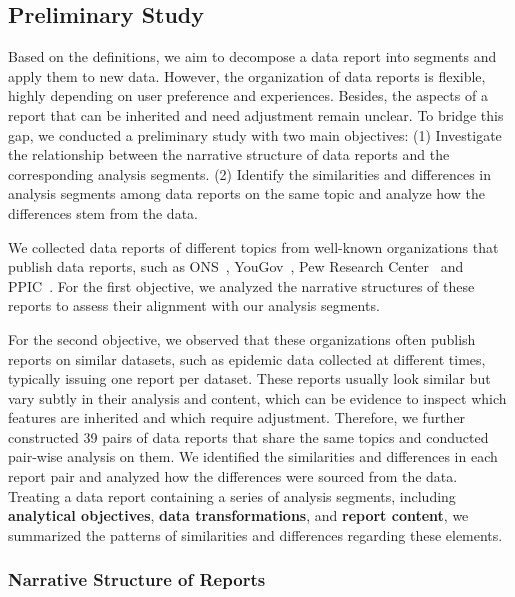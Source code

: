 \subsection{Preliminary Study}
\label{subsec:preliminary_study_settings}

Based on the definitions, we aim to decompose a data report into segments and apply them to new data. 
However, the organization of data reports is flexible, highly depending on user preference and experiences. 
Besides, the aspects of a report that can be inherited and need adjustment remain unclear. 
To bridge this gap, we conducted a preliminary study with two main objectives:
(1) Investigate the relationship between the narrative structure of data reports and the corresponding analysis segments. 
(2) Identify the similarities and differences in analysis segments among data reports on the same topic and analyze how the differences stem from the data.

We collected data reports of different topics from well-known organizations that publish data reports, such as ONS~\cite{ons}, YouGov~\cite{yougov}, Pew Research Center~\cite{pewResearchCenter} and PPIC~\cite{ppic}. 
For the first objective, we analyzed the narrative structures of these reports to assess their alignment with our analysis segments. 

For the second objective, we observed that these organizations often publish reports on similar datasets, such as epidemic data collected at different times, typically issuing one report per dataset. 
These reports usually look similar but vary subtly in their analysis and content, which can be evidence to inspect which features are inherited and which require adjustment. 
Therefore, we further constructed 39 pairs of data reports that share the same topics and conducted pair-wise analysis on them. 
We identified the similarities and differences in each report pair and analyzed how the differences were sourced from the data. 
Treating a data report containing a series of analysis segments, including \textbf{analytical objectives}, \textbf{data transformations}, and \textbf{report content}, we summarized the patterns of similarities and differences regarding these elements.

\subsubsection{Narrative Structure of Reports}

